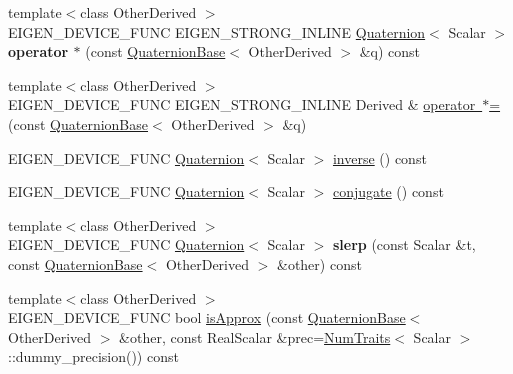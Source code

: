 \begin{DoxyCompactItemize}
\item 
\mbox{\label{class_eigen_1_1_quaternion_base_ae7ecd1c07a5b25d3f265b3748025c6b5}} 
{\footnotesize template$<$class Other\+Derived $>$ }\\E\+I\+G\+E\+N\+\_\+\+D\+E\+V\+I\+C\+E\+\_\+\+F\+U\+NC E\+I\+G\+E\+N\+\_\+\+S\+T\+R\+O\+N\+G\+\_\+\+I\+N\+L\+I\+NE \mbox{\hyperlink{class_eigen_1_1_quaternion}{Quaternion}}$<$ Scalar $>$ {\bfseries operator $\ast$} (const \mbox{\hyperlink{class_eigen_1_1_quaternion_base}{Quaternion\+Base}}$<$ Other\+Derived $>$ \&q) const
\item 
{\footnotesize template$<$class Other\+Derived $>$ }\\E\+I\+G\+E\+N\+\_\+\+D\+E\+V\+I\+C\+E\+\_\+\+F\+U\+NC E\+I\+G\+E\+N\+\_\+\+S\+T\+R\+O\+N\+G\+\_\+\+I\+N\+L\+I\+NE Derived \& \mbox{\hyperlink{class_eigen_1_1_quaternion_base_a767807cc9b81b55676ca0c5fdeb86a40}{operator $\ast$=}} (const \mbox{\hyperlink{class_eigen_1_1_quaternion_base}{Quaternion\+Base}}$<$ Other\+Derived $>$ \&q)
\item 
E\+I\+G\+E\+N\+\_\+\+D\+E\+V\+I\+C\+E\+\_\+\+F\+U\+NC \mbox{\hyperlink{class_eigen_1_1_quaternion}{Quaternion}}$<$ Scalar $>$ \mbox{\hyperlink{class_eigen_1_1_quaternion_base_a6a1d8af1fe34cb4127f705c0d10ef649}{inverse}} () const
\item 
E\+I\+G\+E\+N\+\_\+\+D\+E\+V\+I\+C\+E\+\_\+\+F\+U\+NC \mbox{\hyperlink{class_eigen_1_1_quaternion}{Quaternion}}$<$ Scalar $>$ \mbox{\hyperlink{class_eigen_1_1_quaternion_base_aa82dabadce488031c298a5a0a92cda14}{conjugate}} () const
\item 
\mbox{\label{class_eigen_1_1_quaternion_base_a090701dfe35ddd68642078f410d40082}} 
{\footnotesize template$<$class Other\+Derived $>$ }\\E\+I\+G\+E\+N\+\_\+\+D\+E\+V\+I\+C\+E\+\_\+\+F\+U\+NC \mbox{\hyperlink{class_eigen_1_1_quaternion}{Quaternion}}$<$ Scalar $>$ {\bfseries slerp} (const Scalar \&t, const \mbox{\hyperlink{class_eigen_1_1_quaternion_base}{Quaternion\+Base}}$<$ Other\+Derived $>$ \&other) const
\item 
{\footnotesize template$<$class Other\+Derived $>$ }\\E\+I\+G\+E\+N\+\_\+\+D\+E\+V\+I\+C\+E\+\_\+\+F\+U\+NC bool \mbox{\hyperlink{class_eigen_1_1_quaternion_base_a83c9e817b726fb798d3f2e15002a4241}{is\+Approx}} (const \mbox{\hyperlink{class_eigen_1_1_quaternion_base}{Quaternion\+Base}}$<$ Other\+Derived $>$ \&other, const Real\+Scalar \&prec=\mbox{\hyperlink{struct_eigen_1_1_num_traits}{Num\+Traits}}$<$ Scalar $>$\+::dummy\+\_\+precision()) const

\end{DoxyCompactItemize}
